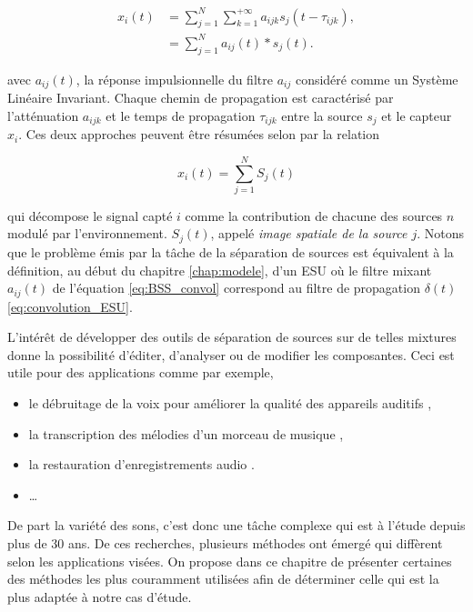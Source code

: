\begin{subequations}
\begin{align}
x_i(t) &= \sum_{j = 1}^{N} \sum_{k = 1}^{+\infty} a_{ijk} s_j(t-\tau_{ijk}),\\
 &= \sum_{j = 1}^{N} a_{ij}(t) \ast s_j(t).\label{eq:BSS_convol}
\end{align}
\end{subequations}

avec $a_{ij}(t)$, la réponse impulsionnelle du filtre $a_{ij}$ considéré comme un Système Linéaire Invariant.
Chaque chemin de propagation est caractérisé par l'atténuation $a_{ijk}$ et le temps de propagation $\tau_{ijk}$ entre la source $s_j$ et le capteur $x_i$. Ces deux approches peuvent être résumées selon \cite{cardoso_blind_1998} par la relation  

\begin{equation}
x_i(t) = \sum_{j = 1}^{N}S_j(t)
\end{equation}


qui décompose le signal capté $i$ comme la contribution de chacune des sources $n$ modulé par l'environnement. $S_j(t)$, appelé \textit{image spatiale de la source $j$}. 
Notons que le problème émis par la tâche de la séparation de sources est équivalent à la définition, au début du chapitre \ref{chap:modele}, d'un ESU où le filtre mixant $a_{ij}(t)$ de l'équation \ref{eq:BSS_convol} correspond au filtre de propagation $\delta(t)$ \ref{eq:convolution_ESU}. 

L'intérêt de développer des outils de séparation de sources sur de telles mixtures donne la possibilité d'éditer, d'analyser ou de modifier les composantes. Ceci est utile pour des applications comme par exemple,

\begin{itemize}
\item le débruitage de la voix pour améliorer la qualité des appareils auditifs \cite{gannot2017consolidated},
\item la transcription des mélodies d'un morceau de musique \cite{vincent2006musical},
\item la restauration d'enregistrements audio \cite{canadas2016constrained}.
\item \dots
\end{itemize}

De part la variété des sons, c'est donc une tâche complexe qui est à l'étude depuis plus de 30 ans. De ces recherches, plusieurs méthodes ont émergé qui diffèrent selon les applications visées. On propose dans ce chapitre de présenter certaines des méthodes les plus couramment utilisées afin de déterminer celle qui est la plus adaptée à notre cas d'étude.

